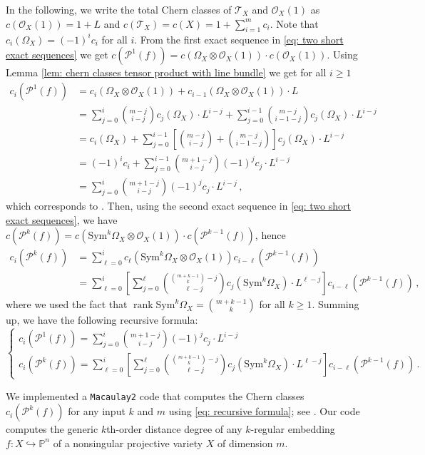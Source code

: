 \documentclass[11pt,reqno]{amsart}
\numberwithin{equation}{section}
\theoremstyle{plain}
\numberwithin{theorem}{section}
\theoremstyle{definition}
\renewcommand{\P}{\mathbb{P}}
\newcommand{\OO}{\mathcal{O}}
\newcommand{\PP}{\mathcal{P}}
\newcommand{\TT}{\mathcal{T}}
\newcommand{\rank}{\operatorname{rank}}
\begin{document}
In the following, we write the total Chern classes of $\TT_X$ and $\OO_X(1)$ as $c(\OO_X(1))=1+L$ and $c(\TT_X)=c(X)=1+\sum_{i=1}^mc_i$. Note that $c_i(\Omega_X)=(-1)^ic_i$ for all $i$. From the first exact sequence in \eqref{eq: two short exact sequences} we get $c(\PP^1(f))=c(\Omega_X\otimes\OO_X(1))\cdot c(\OO_X(1))$. Using Lemma \ref{lem: chern classes tensor product with line bundle} we get for all $i\ge 1$
\begin{align*}
    c_i(\PP^1(f)) &= c_i(\Omega_X\otimes\OO_X(1))+c_{i-1}(\Omega_X\otimes\OO_X(1))\cdot L\\
    &= \sum_{j=0}^i\binom{m-j}{i-j}c_j(\Omega_X)\cdot L^{i-j}+\sum_{j=0}^{i-1}\binom{m-j}{i-1-j}c_j(\Omega_X)\cdot L^{i-j}\\
    &= c_i(\Omega_X)+\sum_{j=0}^{i-1}\left[\binom{m-j}{i-j}+\binom{m-j}{i-1-j}\right]c_j(\Omega_X)\cdot L^{i-j}\\
    &= (-1)^ic_i+\sum_{j=0}^{i-1}\binom{m+1-j}{i-j}(-1)^jc_j\cdot L^{i-j} \\
    &= \sum_{j=0}^i\binom{m+1-j}{i-j}(-1)^jc_j\cdot L^{i-j}\,,
\end{align*}
which corresponds to \cite[\S3]{holme1988geometric}. Then, using the second exact sequence in \eqref{eq: two short exact sequences}, we have $c(\PP^k(f))=c(\mathrm{Sym}^k\Omega_X\otimes\OO_X(1))\cdot c(\PP^{k-1}(f))$, hence
\begin{align*}
    c_i(\PP^k(f)) &= \sum_{\ell=0}^ic_\ell(\mathrm{Sym}^k\Omega_X\otimes\OO_X(1))c_{i-\ell}(\PP^{k-1}(f))\\
    &= \sum_{\ell=0}^i\left[\sum_{j=0}^\ell\binom{\binom{m+k-1}{k}-j}{\ell-j}c_j(\mathrm{Sym}^k\Omega_X)\cdot L^{\ell-j}\right]c_{i-\ell}(\PP^{k-1}(f))\,,
\end{align*}
where we used the fact that $\rank\mathrm{Sym}^k\Omega_X=\binom{m+k-1}{k}$ for all $k\ge 1$. Summing up, we have the following recursive formula:
\begin{equation}\label{eq: recursive formula}
\begin{cases}
    c_i(\PP^1(f)) = \sum_{j=0}^i\binom{m+1-j}{i-j}(-1)^jc_j\cdot L^{i-j}\\
    c_i(\PP^k(f)) = \sum_{\ell=0}^i\left[\sum_{j=0}^\ell\binom{\binom{m+k-1}{k}-j}{\ell-j}c_j(\mathrm{Sym}^k\Omega_X)\cdot L^{\ell-j}\right]c_{i-\ell}(\PP^{k-1}(f))\,.
\end{cases}
\end{equation}

We implemented a \verb|Macaulay2| code \cite{GS} that computes the Chern classes $c_i(\PP^k(f))$ for any input $k$ and $m$ using \eqref{eq: recursive formula}; see \cite{github}. Our code computes the generic $k$th-order distance degree of any $k$-regular embedding $f\colon X\hookrightarrow\P^n$ of a nonsingular projective variety $X$ of dimension $m$.
\end{document}
